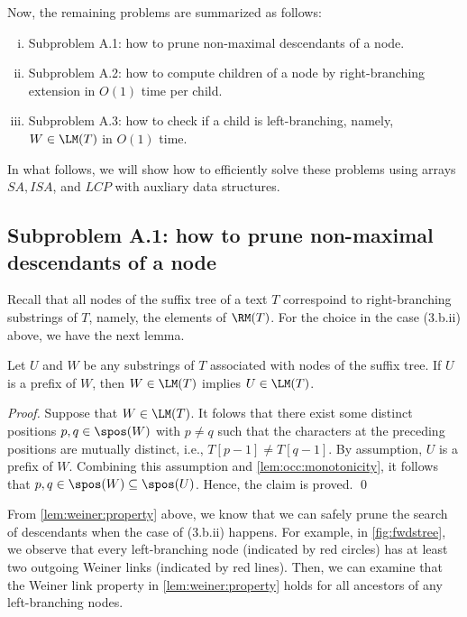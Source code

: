 Now, the remaining problems are summarized as follows:
\begin{enumerate}[(i)]
\item \textsf{Subproblem A.1}: how to prune non-maximal descendants of a node.

\item \textsf{Subproblem A.2}: how to compute children of a node by right-branching extension in $O(1)$ time per child.

\item \textsf{Subproblem A.3}: how to check if a child is left-branching, namely, $W \in \LM(T)$ in $O(1)$ time.
\end{enumerate}

In what follows, we will show how to efficiently solve these problems using arrays $SA, ISA$, and $LCP$ with auxliary data structures. 

\subsection{Subproblem A.1: how to prune non-maximal descendants of a node}

Recall that all nodes of the suffix tree of a text $T$ correspoind to right-branching substrings of $T$, namely, the elements of $\RM(T)$. 
For the choice in the case (3.b.ii) above, we have the next lemma. 

\begin{lemma}
\label{lem:weiner:property}
Let $U$ and $W$ be any substrings of $T$ associated with nodes of the suffix tree. If $U$ is a prefix of $W$, then $W \in \LM(T)$ implies $U \in \LM(T)$. 
\end{lemma}

\begin{proof}
Suppose that $W \in \LM(T)$. It folows that there exist some distinct positions $p, q \in \spos(W)$ with $p\not= q$ such that the characters at the preceding positions are mutually distinct, i.e., $T[p-1]\not = T[q-1]$. By assumption, $U$ is a prefix of $W$. Combining this assumption and \cref{lem:occ:monotonicity}, it follows  that $p,q \in \spos(W) \subseteq \spos(U)$. Hence, the claim is proved. 
\qed
\end{proof}

From \cref{lem:weiner:property} above, we know that we can safely prune the search of descendants when the case of (3.b.ii)  happens.
For example, in \cref{fig:fwdstree}, we observe that every left-branching node (indicated by red circles) has at least two outgoing Weiner links (indicated by red lines). Then, we can examine that the Weiner link property in \cref{lem:weiner:property} holds for all ancestors of any left-branching nodes. 

